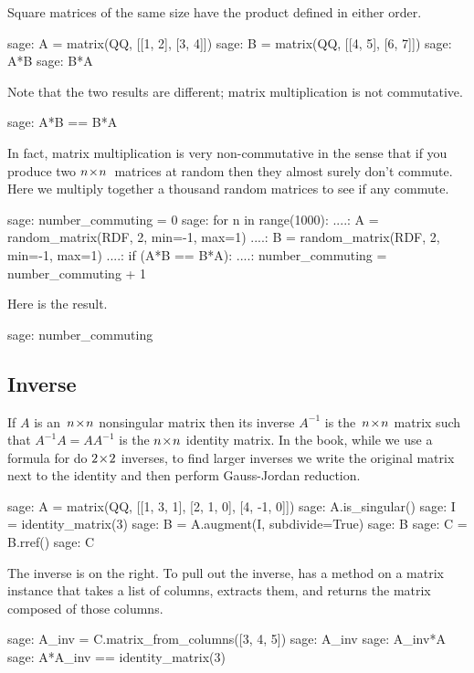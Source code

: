 Square matrices of the same size have the product defined in either order.
\begin{sagecommandline}
sage: A = matrix(QQ, [[1, 2], [3, 4]])
sage: B = matrix(QQ, [[4, 5], [6, 7]])
sage: A*B
sage: B*A
\end{sagecommandline}
Note that the two results are
different; matrix multiplication is not commutative.
\begin{sagecommandline}[d,0,2]
sage: A*B == B*A
\end{sagecommandline}

In fact, matrix multiplication is very non-commutative 
in the sense that if you produce two $n \! \times \! n$~matrices
at random then they almost surely don't commute.
Here we multiply together a thousand random matrices to see
if any commute.
\begin{sagecommandline}
sage: number_commuting = 0 
sage: for n in range(1000):                                       
....:     A = random_matrix(RDF, 2, min=-1, max=1)
....:     B = random_matrix(RDF, 2, min=-1, max=1)
....:     if (A*B == B*A):
....:         number_commuting = number_commuting + 1 
\end{sagecommandline}
Here is the result.
\begin{sagecommandline}
sage: number_commuting
\end{sagecommandline}

 


\subsection{Inverse}
If $A$ is an~$n \! \times \! n$ nonsingular matrix then its inverse $A^{-1}$
is the~$n \! \times \! n$ matrix such that $A^{-1}A=AA^{-1}$ is the 
$n \! \times \! n$ identity matrix. 
In the book, while we use a formula for do $2 \! \times \! 2$ inverses,
to find larger inverses 
we write the original matrix next to the identity
and then perform Gauss-Jordan reduction.
\begin{sagecommandline}
sage: A = matrix(QQ, [[1, 3, 1], [2, 1, 0], [4, -1, 0]])
sage: A.is_singular()
sage: I = identity_matrix(3)
sage: B = A.augment(I, subdivide=True)
sage: B
sage: C = B.rref()
sage: C
\end{sagecommandline}
The inverse is on the right.
To pull out the inverse, 
\Sage{} has a  method 
on a matrix instance that takes a list of 
columns, extracts them, and returns the matrix composed of those columns.
\begin{sagecommandline}
sage: A_inv = C.matrix_from_columns([3, 4, 5])
sage: A_inv
sage: A_inv*A
sage: A*A_inv == identity_matrix(3)
\end{sagecommandline}


